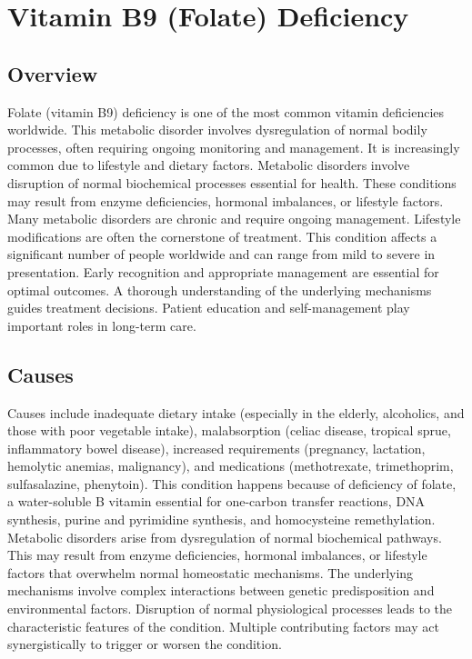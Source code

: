 \chapter{Vitamin B9 (Folate) Deficiency}
\label{sec:Vitamin B9 Deficiency}

\section{Overview}
Folate (vitamin B9) deficiency is one of the most common vitamin deficiencies worldwide. This metabolic disorder involves dysregulation of normal bodily processes, often requiring ongoing monitoring and management. It is increasingly common due to lifestyle and dietary factors. Metabolic disorders involve disruption of normal biochemical processes essential for health. These conditions may result from enzyme deficiencies, hormonal imbalances, or lifestyle factors. Many metabolic disorders are chronic and require ongoing management. Lifestyle modifications are often the cornerstone of treatment. This condition affects a significant number of people worldwide and can range from mild to severe in presentation. Early recognition and appropriate management are essential for optimal outcomes. A thorough understanding of the underlying mechanisms guides treatment decisions. Patient education and self-management play important roles in long-term care.
\section{Causes}
Causes include inadequate dietary intake (especially in the elderly, alcoholics, and those with poor vegetable intake), malabsorption (celiac disease, tropical sprue, inflammatory bowel disease), increased requirements (pregnancy, lactation, hemolytic anemias, malignancy), and medications (methotrexate, trimethoprim, sulfasalazine, phenytoin). This condition happens because of deficiency of folate, a water-soluble B vitamin essential for one-carbon transfer reactions, DNA synthesis, purine and pyrimidine synthesis, and homocysteine remethylation. Metabolic disorders arise from dysregulation of normal biochemical pathways. This may result from enzyme deficiencies, hormonal imbalances, or lifestyle factors that overwhelm normal homeostatic mechanisms. The underlying mechanisms involve complex interactions between genetic predisposition and environmental factors. Disruption of normal physiological processes leads to the characteristic features of the condition. Multiple contributing factors may act synergistically to trigger or worsen the condition.
